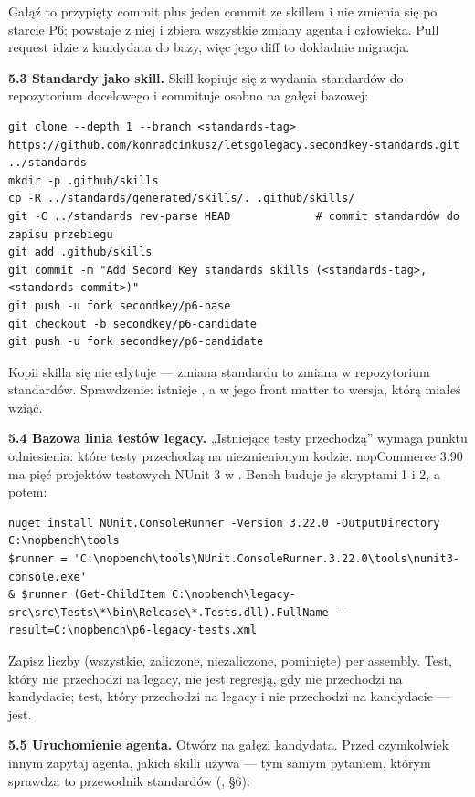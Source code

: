 Gałąź  to przypięty commit plus jeden commit ze skillem i nie
zmienia się po starcie P6;  powstaje z niej i zbiera
wszystkie zmiany agenta i człowieka. Pull request idzie z kandydata do bazy, więc jego
diff to dokładnie migracja.

\textbf{5.3 Standardy jako skill.} Skill kopiuje się z wydania standardów do
 repozytorium docelowego i commituje osobno na gałęzi bazowej:

\begin{lstlisting}
git clone --depth 1 --branch <standards-tag> https://github.com/konradcinkusz/letsgolegacy.secondkey-standards.git ../standards
mkdir -p .github/skills
cp -R ../standards/generated/skills/. .github/skills/
git -C ../standards rev-parse HEAD             # commit standardów do zapisu przebiegu
git add .github/skills
git commit -m "Add Second Key standards skills (<standards-tag>, <standards-commit>)"
git push -u fork secondkey/p6-base
git checkout -b secondkey/p6-candidate
git push -u fork secondkey/p6-candidate
\end{lstlisting}

Kopii skilla się nie edytuje --- zmiana standardu to zmiana w repozytorium standardów.
Sprawdzenie: istnieje
, a
 w jego front matter to wersja, którą miałeś wziąć.

\textbf{5.4 Bazowa linia testów legacy.} „Istniejące testy przechodzą” wymaga punktu
odniesienia: które testy przechodzą na niezmienionym kodzie. nopCommerce 3.90 ma pięć
projektów testowych NUnit 3 w . Bench buduje je skryptami 1 i 2, a potem:

\begin{lstlisting}
nuget install NUnit.ConsoleRunner -Version 3.22.0 -OutputDirectory C:\nopbench\tools
$runner = 'C:\nopbench\tools\NUnit.ConsoleRunner.3.22.0\tools\nunit3-console.exe'
& $runner (Get-ChildItem C:\nopbench\legacy-src\src\Tests\*\bin\Release\*.Tests.dll).FullName --result=C:\nopbench\p6-legacy-tests.xml
\end{lstlisting}

Zapisz liczby (wszystkie, zaliczone, niezaliczone, pominięte) per assembly. Test, który
nie przechodzi na legacy, nie jest regresją, gdy nie przechodzi na kandydacie; test, który
przechodzi na legacy i nie przechodzi na kandydacie --- jest.

\textbf{5.5 Uruchomienie agenta.} Otwórz  na gałęzi kandydata. Przed
czymkolwiek innym zapytaj agenta, jakich skilli używa --- tym samym pytaniem, którym
sprawdza to przewodnik standardów (, §6):

